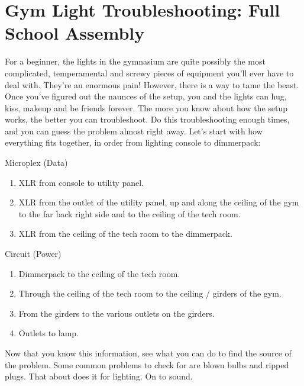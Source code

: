 \documentclass[11pt,a4paper]{book}
\begin{document}
\section{Gym Light Troubleshooting: Full School Assembly
}
For a beginner, the lights in the gymnasium are quite possibly the most complicated, temperamental and screwy pieces of equipment you'll ever have to deal with. They're an enormous pain! However, there is a way to tame the beast. Once you've figured out the naunces of the setup, you and the lights can hug, kiss, makeup and be friends forever. The more you know about how the setup works, the better you can troubleshoot. Do this troubleshooting enough times, and you can guess the problem almost right away. Let's start with how everything fits together, in order from lighting console to dimmerpack:
\begin{center}
Microplex (Data)
\end{center}
\begin{enumerate}
\item XLR from console to utility panel.
\item XLR from the outlet of the utility panel, up and along the ceiling of the gym to the far back right side and to the ceiling of the tech room.
\item XLR from the ceiling of the tech room to the dimmerpack.
\end{enumerate}

\pagebreak 
\begin{center}
Circuit (Power)
\end{center}
\begin{enumerate}
\item Dimmerpack to the ceiling of the tech room.
\item Through the ceiling of the tech room to the ceiling / girders of the gym.
\item From the girders to the various outlets on the girders.
\item Outlets to lamp.
\end{enumerate}

Now that you know this information, see what you can do to find the source of the problem. Some common problems to check for are blown bulbs and ripped plugs. That about does it for lighting. On to sound.
\end{document}
